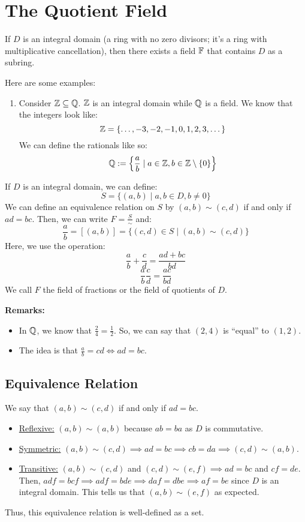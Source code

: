 \documentclass[letterpaper]{article}
\begin{document}
\section{The Quotient Field}

\begin{theorem}{}{}
    If $D$ is an integral domain (a ring with no zero divisors; it's a ring with multiplicative cancellation), then there exists a field $\mathbb{F}$ that contains $D$ as a subring. 
\end{theorem}
Here are some examples: 
\begin{enumerate}
    \item Consider $\mathbb{Z} \subseteq \mathbb{Q}$. $\mathbb{Z}$ is an integral domain while $\mathbb{Q}$ is a field. We know that the integers look like: 
    \[\mathbb{Z} = \{\dots, -3, -2, -1, 0, 1, 2, 3, \dots\}\]
    We can define the rationals like so: 
    \[\mathbb{Q} := \left\{\frac{a}{b} \mid a \in \mathbb{Z}, b \in \mathbb{Z} \setminus \{0\}\right\}\]
\end{enumerate}

\begin{definition}{}{}
    If $D$ is an integral domain, we can define:
    \[S = \{(a, b) \mid a, b \in D, b \neq 0\}\]
    We can define an equivalence relation on $S$ by $(a, b) \sim (c, d)$ if and only if $ad = bc$. Then, we can write $F = \frac{S}{\sim}$ and:
    \[\frac{a}{b} = [(a, b)] = \{(c, d) \in S \mid (a, b) \sim (c, d)\}\]
    Here, we use the operation: 
    \[\frac{a}{b} + \frac{c}{d} = \frac{ad + bc}{bd}\]
    \[\frac{a}{b} \frac{c}{d} = \frac{ac}{bd}\]
    We call $F$ the field of fractions or the field of quotients of $D$. 
\end{definition}
\textbf{Remarks:} 
\begin{itemize}
    \item In $\mathbb{Q}$, we know that $\frac{2}{4} = \frac{1}{2}$. So, we can say that $(2, 4)$ is ``equal'' to $(1, 2)$.
    \item The idea is that $\frac{a}{b} = cd \iff ad = bc$. 
\end{itemize} 

\subsection{Equivalence Relation}
We say that $(a, b) \sim (c, d)$ if and only if $ad = bc$.
\begin{itemize}
    \item \underline{Reflexive:} $(a, b) \sim (a, b)$ because $ab = ba$ as $D$ is commutative.
    \item \underline{Symmetric:} $(a, b) \sim (c, d) \implies ad = bc \implies cb = da \implies (c, d) \sim (a, b)$. 
    \item \underline{Transitive:} $(a, b) \sim (c, d)$ and $(c, d) \sim (e, f) \implies ad = bc$ and $cf = de$. Then, $adf = bcf \implies adf = bde \implies daf = dbe \implies af = be$ since $D$ is an integral domain. This tells us that $(a, b) \sim (e, f)$ as expected. 
\end{itemize}
Thus, this equivalence relation is well-defined as a set. 
\end{document}
